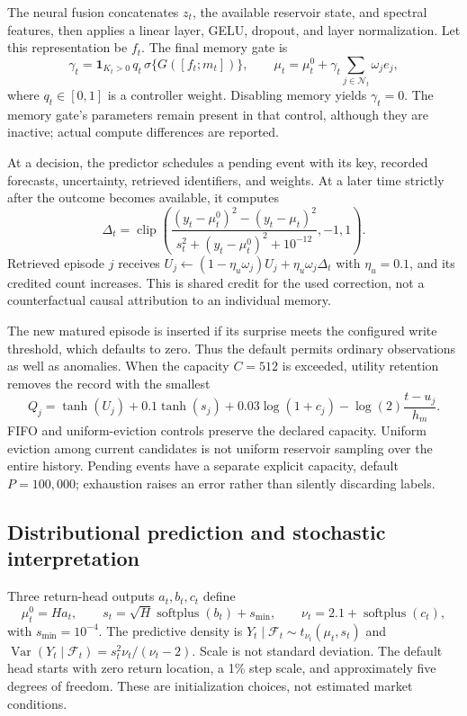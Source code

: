 \documentclass[11pt,a4paper]{article}
\newcommand{\F}{\mathcal F}
\newcommand{\ind}{\mathbf 1}
\newcommand{\softplus}{\operatorname{softplus}}
\newcommand{\clip}{\operatorname{clip}}
\begin{document}
The neural fusion concatenates $z_t$, the available reservoir state, and spectral features, then applies a linear layer, GELU, dropout, and layer normalization. Let this representation be $f_t$. The final memory gate is
\begin{equation}
\gamma_t=\ind_{K_t>0}\,q_t\,\sigma\{G([f_t;m_t])\},\qquad
\mu_t=\mu^0_t+\gamma_t\sum_{j\in\mathcal N_t}\omega_je_j,
\end{equation}
where $q_t\in[0,1]$ is a controller weight. Disabling memory yields $\gamma_t=0$. The memory gate's parameters remain present in that control, although they are inactive; actual compute differences are reported.

At a decision, the predictor schedules a pending event with its key, recorded forecasts, uncertainty, retrieved identifiers, and weights. At a later time strictly after the outcome becomes available, it computes
\begin{equation}
\Delta_t=\clip\left(\frac{(y_t-\mu^0_t)^2-(y_t-\mu_t)^2}{s_t^2+(y_t-\mu^0_t)^2+10^{-12}},-1,1\right).
\end{equation}
Retrieved episode $j$ receives $U_j\leftarrow(1-\eta_u\omega_j)U_j+\eta_u\omega_j\Delta_t$ with $\eta_u=0.1$, and its credited count increases. This is shared credit for the used correction, not a counterfactual causal attribution to an individual memory.

The new matured episode is inserted if its surprise meets the configured write threshold, which defaults to zero. Thus the default permits ordinary observations as well as anomalies. When the capacity $C=512$ is exceeded, utility retention removes the record with the smallest
\begin{equation}
Q_j=\tanh(U_j)+0.1\tanh(s_j)+0.03\log(1+c_j)-\log(2)\frac{t-u_j}{h_m}.
\end{equation}
FIFO and uniform-eviction controls preserve the declared capacity. Uniform eviction among current candidates is not uniform reservoir sampling over the entire history. Pending events have a separate explicit capacity, default $P=100{,}000$; exhaustion raises an error rather than silently discarding labels.

\subsection{Distributional prediction and stochastic interpretation}

Three return-head outputs $a_t,b_t,c_t$ define
\begin{equation}
\mu^0_t=Ha_t,\qquad s_t=\sqrt H\softplus(b_t)+s_{\min},\qquad
\nu_t=2.1+\softplus(c_t),
\end{equation}
with $s_{\min}=10^{-4}$. The predictive density is $Y_t\mid\F_t\sim t_{\nu_t}(\mu_t,s_t)$ and $\operatorname{Var}(Y_t\mid\F_t)=s_t^2\nu_t/(\nu_t-2)$. Scale is not standard deviation. The default head starts with zero return location, a 1\% step scale, and approximately five degrees of freedom. These are initialization choices, not estimated market conditions.
\end{document}
